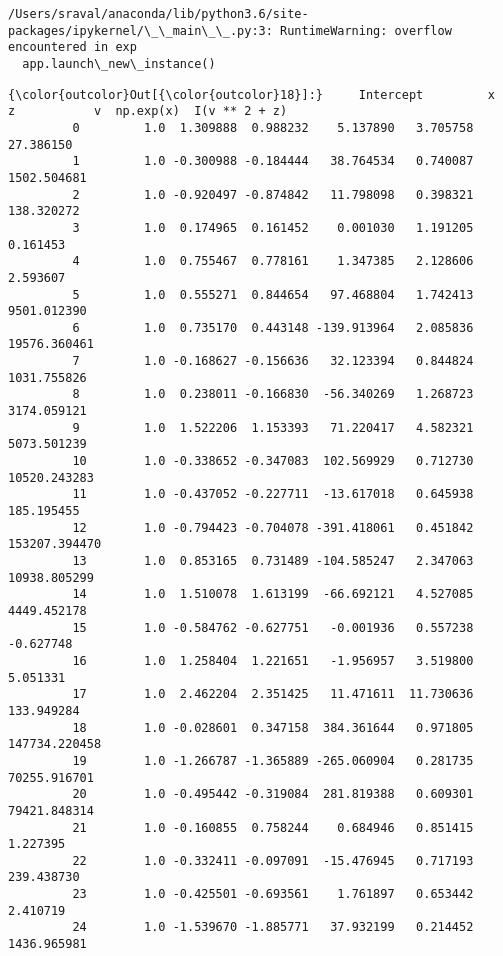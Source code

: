 \documentclass[11pt]{article}
\begin{document}
    \begin{Verbatim}[commandchars=\\\{\}]
/Users/sraval/anaconda/lib/python3.6/site-packages/ipykernel/\_\_main\_\_.py:3: RuntimeWarning: overflow encountered in exp
  app.launch\_new\_instance()

    \end{Verbatim}

\begin{Verbatim}[commandchars=\\\{\}]
{\color{outcolor}Out[{\color{outcolor}18}]:}     Intercept         x         z           v  np.exp(x)  I(v ** 2 + z)
         0         1.0  1.309888  0.988232    5.137890   3.705758      27.386150
         1         1.0 -0.300988 -0.184444   38.764534   0.740087    1502.504681
         2         1.0 -0.920497 -0.874842   11.798098   0.398321     138.320272
         3         1.0  0.174965  0.161452    0.001030   1.191205       0.161453
         4         1.0  0.755467  0.778161    1.347385   2.128606       2.593607
         5         1.0  0.555271  0.844654   97.468804   1.742413    9501.012390
         6         1.0  0.735170  0.443148 -139.913964   2.085836   19576.360461
         7         1.0 -0.168627 -0.156636   32.123394   0.844824    1031.755826
         8         1.0  0.238011 -0.166830  -56.340269   1.268723    3174.059121
         9         1.0  1.522206  1.153393   71.220417   4.582321    5073.501239
         10        1.0 -0.338652 -0.347083  102.569929   0.712730   10520.243283
         11        1.0 -0.437052 -0.227711  -13.617018   0.645938     185.195455
         12        1.0 -0.794423 -0.704078 -391.418061   0.451842  153207.394470
         13        1.0  0.853165  0.731489 -104.585247   2.347063   10938.805299
         14        1.0  1.510078  1.613199  -66.692121   4.527085    4449.452178
         15        1.0 -0.584762 -0.627751   -0.001936   0.557238      -0.627748
         16        1.0  1.258404  1.221651   -1.956957   3.519800       5.051331
         17        1.0  2.462204  2.351425   11.471611  11.730636     133.949284
         18        1.0 -0.028601  0.347158  384.361644   0.971805  147734.220458
         19        1.0 -1.266787 -1.365889 -265.060904   0.281735   70255.916701
         20        1.0 -0.495442 -0.319084  281.819388   0.609301   79421.848314
         21        1.0 -0.160855  0.758244    0.684946   0.851415       1.227395
         22        1.0 -0.332411 -0.097091  -15.476945   0.717193     239.438730
         23        1.0 -0.425501 -0.693561    1.761897   0.653442       2.410719
         24        1.0 -1.539670 -1.885771   37.932199   0.214452    1436.965981

\end{Verbatim}
\end{document}
